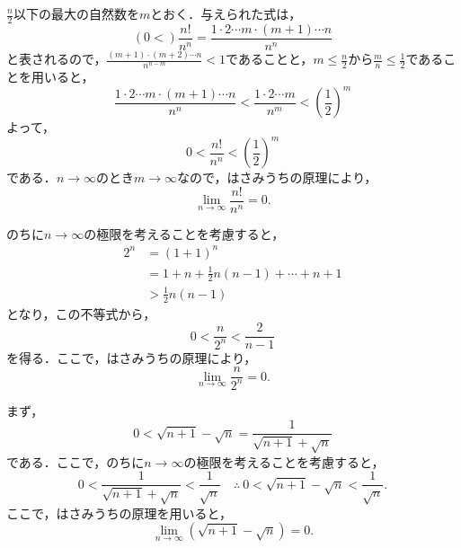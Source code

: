 
\begin{tanswer}
    $\frac{n}{2}$以下の最大の自然数を$m$とおく．与えられた式は，
    \[
        \left( 0  < \right) \frac{n!}{n^n}  = \frac{1 \cdot 2 \dotsm m \cdot (m+1) \dotsm n}{n^n}
    \]
    と表されるので，$\frac{(m+1) \cdot (m+2) \dotsm n}{n^{n-m}} <1$であることと，$m \le \frac{n}{2}$から$\frac{m}{n} \le \frac{1}{2}$であることを用いると，
    \[
        \frac{1 \cdot 2 \dotsm m \cdot (m+1) \dotsm n}{n^n} < \frac{1 \cdot 2 \dotsm m}{n^m} <\left(\frac{1}{2}\right)^m
    \]
    よって，
    \[
        0 < \frac{n!}{n^n} <\left(\frac{1}{2}\right)^m
    \]
    である．$n \to \infty$のとき$m \to \infty$なので，はさみうちの原理により，
    \[
        \lim_{n \to \infty}\frac{n!}{n^n} =0.
    \]
\end{tanswer}
\begin{tanswer}
    のちに$n \to \infty$の極限を考えることを考慮すると，
    \begin{align*}
        2^n & = (1+1)^n                             \\
            & =1+n +\frac{1}{2} n(n-1)+ \cdots +n+1 \\
            & > \frac{1}{2} n(n-1)
    \end{align*}
    となり，この不等式から，
    \[
        0< \frac{n}{2^n} < \frac{2}{n-1}
    \]
    を得る．ここで，はさみうちの原理により，
    \[
        \lim_{n \to \infty} \frac{n}{2^n}=0.
    \]
\end{tanswer}

\begin{tanswer}
    まず，
    \[
        0<\sqrt{n+1} - \sqrt{n} = \frac{1}{\sqrt{n+1} + \sqrt{n}}
    \]
    である．ここで，のちに$n \to \infty$の極限を考えることを考慮すると，
    \[
        0< \frac{1}{\sqrt{n+1} + \sqrt{n}} < \frac{1}{\sqrt{n}} \quad  \therefore ~ 0< \sqrt{n+1} - \sqrt{n} <\frac{1}{\sqrt{n}}.
    \]
    ここで，はさみうちの原理を用いると，
    \[
        \lim_{n \to \infty} (\sqrt{n+1} - \sqrt{n} )=0.
    \]
\end{tanswer}


